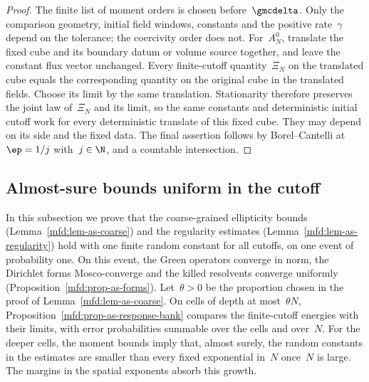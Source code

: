 \documentclass[11pt]{amsart}
\begin{document}
\begin{proof}
\smallskip

The finite list of moment orders is chosen before~$\gmcdelta$. Only the comparison geometry, initial field windows, constants and the positive rate~$\gamma$ depend on the tolerance; the coercivity order does not. For~$A_N^0$, translate the fixed cube and its boundary datum or volume source together, and leave the constant flux vector unchanged. Every finite-cutoff quantity~$\Xi_N$ on the translated cube equals the corresponding quantity on the original cube in the translated fields. Choose its limit by the same translation. Stationarity therefore preserves the joint law of~$\Xi_N$ and its limit, so the same constants and deterministic initial cutoff work for every deterministic translate of this fixed cube. They may depend on its side and the fixed data. The final assertion follows by Borel--Cantelli at~$\ep=1/j$ with~$j\in\N$, and a countable intersection.
\end{proof}

\subsection{Almost-sure bounds uniform in the cutoff}
\label{mfd:sec-pathwise-bounds}

In this subsection we prove that the coarse-grained ellipticity bounds (Lemma~\ref{mfd:lem-as-coarse}) and the regularity estimates (Lemma~\ref{mfd:lem-as-regularity}) hold with one finite random constant for all cutoffs, on one event of probability one. On this event, the Green operators converge in norm, the Dirichlet forms Mosco-converge and the killed resolvents converge uniformly (Proposition~\ref{mfd:prop-as-forms}). Let~$\theta>0$ be the proportion chosen in the proof of Lemma~\ref{mfd:lem-as-coarse}. On cells of depth at most~$\theta N$, Proposition~\ref{mfd:prop-as-response-bank} compares the finite-cutoff energies with their limits, with error probabilities summable over the cells and over~$N$. For the deeper cells, the moment bounds imply that, almost surely, the random constants in the estimates are smaller than every fixed exponential in~$N$ once~$N$ is large. The margins in the spatial exponents absorb this growth.
\end{document}
